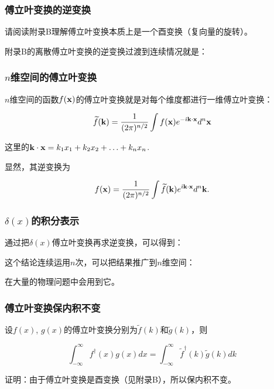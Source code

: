 \documentclass[CJK,13pt]{beamer}
\begin{document}

\begin{frame}
  \frametitle{傅立叶变换的逆变换}
  请阅读附录B理解傅立叶变换本质上是一个酉变换（复向量的旋转）。

  附录B的离散傅立叶变换的逆变换过渡到连续情况就是：
\end{frame}

\begin{frame}
  \frametitle{$n$维空间的傅立叶变换}
  
  $n$维空间的函数$f({\mathbf{x}})$的傅立叶变换就是对每个维度都进行一维傅立叶变换：
  
  $$ \widetilde{f}({\mathbf{k}}) = \frac{1}{(2\pi)^{n/2}}\int f({\mathbf{x}}) e^{-{\dot{\imath}} {\mathbf{k}} \cdot {\mathbf{x}}} d^n{\mathbf{x}} $$

  这里的${\mathbf{k}}\cdot{\mathbf{x}} = k_1x_1+k_2x_2+\ldots+k_nx_n$.
  
  
  显然，其逆变换为
  
  $$ f({\mathbf{x}}) = \frac{1}{(2\pi)^{n/2}}\int \widetilde{f}({\mathbf{k}}) e^{{\dot{\imath}} {\mathbf{k}} \cdot {\mathbf{x}}} d^n{\mathbf{k}}. $$

\end{frame}



\begin{frame}
  \frametitle{$\delta(x)$的积分表示}
  通过把$\delta(x)$傅立叶变换再求逆变换，可以得到：
  

  这个结论连续运用$n$次，可以把结果推广到$n$维空间：
  
  在大量的物理问题中会用到它。
\end{frame}

\begin{frame}
  \frametitle{傅立叶变换保内积不变}

  设$f(x)$, $g(x)$的傅立叶变换分别为$\widetilde{f}(k)$和$\widetilde{g}(k)$，则

  $$\int_{-\infty}^\infty f^\dagger(x) g(x) dx =  \int_{-\infty}^\infty \widetilde{f}^\dagger(k) \widetilde{g}(k) dk$$
  
  证明：由于傅立叶变换是酉变换（见附录B），所以保内积不变。
  
\end{frame}
\end{document}
